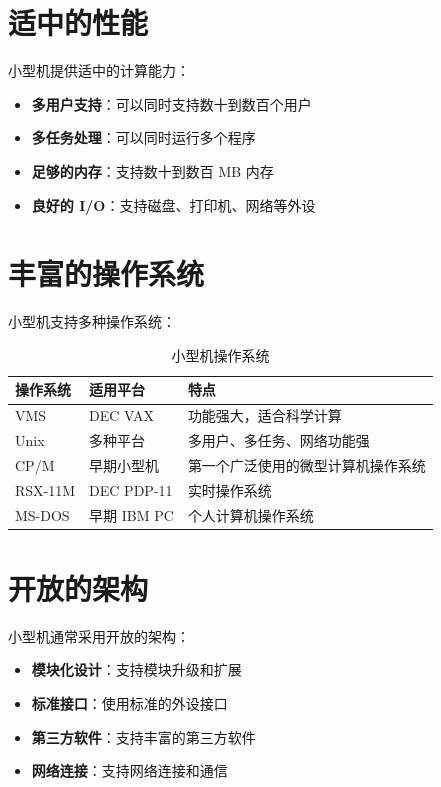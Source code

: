 \documentclass[12pt,UTF8]{ctexbook}
\begin{document}
\section{适中的性能}

小型机提供适中的计算能力：

\begin{itemize}[leftmargin=2cm]
    \item \textbf{多用户支持}：可以同时支持数十到数百个用户
    \item \textbf{多任务处理}：可以同时运行多个程序
    \item \textbf{足够的内存}：支持数十到数百 MB 内存
    \item \textbf{良好的 I/O}：支持磁盘、打印机、网络等外设
\end{itemize}

\section{丰富的操作系统}

小型机支持多种操作系统：

\begin{table}[htbp]
    \centering
    \caption{小型机操作系统}
    \begin{tabular}{|p{3cm}|p{3cm}|p{4cm}|}
        \hline
        \textbf{操作系统} & \textbf{适用平台} & \textbf{特点} \\
        \hline
        VMS & DEC VAX & 功能强大，适合科学计算 \\
        \hline
        Unix & 多种平台 & 多用户、多任务、网络功能强 \\
        \hline
        CP/M & 早期小型机 & 第一个广泛使用的微型计算机操作系统 \\
        \hline
        RSX-11M & DEC PDP-11 & 实时操作系统 \\
        \hline
        MS-DOS & 早期 IBM PC & 个人计算机操作系统 \\
        \hline
    \end{tabular}
\end{table}

\section{开放的架构}

小型机通常采用开放的架构：

\begin{itemize}[leftmargin=2cm]
    \item \textbf{模块化设计}：支持模块升级和扩展
    \item \textbf{标准接口}：使用标准的外设接口
    \item \textbf{第三方软件}：支持丰富的第三方软件
    \item \textbf{网络连接}：支持网络连接和通信
\end{itemize}
\end{document}
